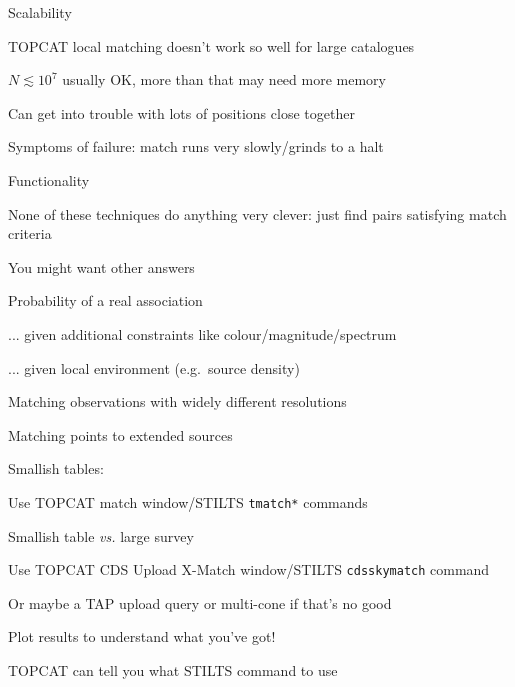 \documentclass[20pt,landscape]{foils}
\begin{document}

\begin{list0}
  \item Scalability
  \begin{list2}
    \item TOPCAT local matching doesn't work so well for large catalogues
    \begin{list3}
      \item $N \lesssim 10^{7}$ usually OK, more than that may need more memory
    \end{list3}
    \item Can get into trouble with lots of positions close together
    \item Symptoms of failure: match runs very slowly/grinds to a halt
  \end{list2}
  \item Functionality
  \begin{list2}
    \item None of these techniques do anything very clever:
          just find pairs satisfying match criteria
    \item You might want other answers
    \begin{list3}
      \item Probability of a real association
      \item ... given additional constraints like colour/magnitude/spectrum
      \item ... given local environment (e.g.\ source density)
      \item Matching observations with widely different resolutions
      \item Matching points to extended sources
    \end{list3}
  \end{list2}
\end{list0}


\begin{list0}
  \item Smallish tables:
  \begin{list2big}
    \item Use TOPCAT match window/STILTS {\color{brown}\tt tmatch*} commands
  \end{list2big}
  \item Smallish table {\sl vs.\/} large survey
  \begin{list2big}
    \item Use TOPCAT CDS Upload X-Match window/STILTS {\color{brown}\tt cdsskymatch} command
    \item Or maybe a TAP upload query or multi-cone if that's no good
  \end{list2big}
  \item Plot results to understand what you've got!
  \item TOPCAT can tell you what STILTS command to use
\end{list0}
\end{document}
